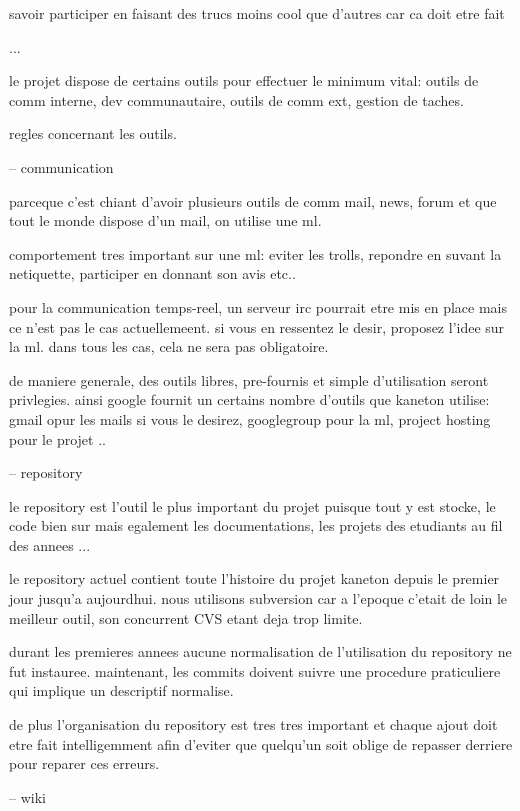 {savoir participer en faisant des trucs moins cool que d'autres car ca
doit etre fait

...

le projet dispose de certains outils pour effectuer le minimum vital:
outils de comm interne, dev communautaire, outils de comm ext, gestion
de taches.

%
%

regles concernant les outils.

-- communication

parceque c'est chiant d'avoir plusieurs outils de comm mail, news, forum
et que tout le monde dispose d'un mail, on utilise une ml.

comportement tres important sur une ml: eviter les trolls, repondre
en suvant la netiquette, participer en donnant son avis etc..

pour la communication temps-reel, un serveur irc pourrait etre mis en
place mais ce n'est pas le cas actuellemeent. si vous en ressentez le
desir, proposez l'idee sur la ml. dans tous les cas, cela ne sera pas
obligatoire.

de maniere generale, des outils libres, pre-fournis et simple d'utilisation
seront privlegies. ainsi google fournit un certains nombre d'outils que
kaneton utilise: gmail opur les mails si vous le desirez, googlegroup pour
la ml, project hosting pour le projet ..

-- repository

le repository est l'outil le plus important du projet puisque tout y
est stocke, le code bien sur mais egalement les documentations, les
projets des etudiants au fil des annees ...

le repository actuel contient toute l'histoire du projet kaneton depuis
le premier jour jusqu'a aujourdhui. nous utilisons subversion car a l'epoque
c'etait de loin le meilleur outil, son concurrent CVS etant deja trop
limite.

durant les premieres annees aucune normalisation de l'utilisation du
repository ne fut instauree. maintenant, les commits doivent suivre une
procedure praticuliere qui implique un descriptif normalise.

de plus l'organisation du repository est tres tres important et chaque ajout
doit etre fait intelligemment afin d'eviter que quelqu'un soit oblige de
repasser derriere pour reparer ces erreurs.

-- wiki

}
